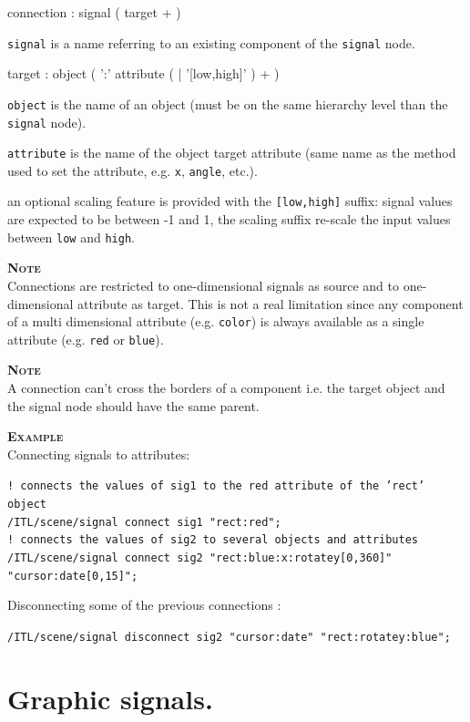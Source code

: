 \documentclass[a4paper,twoside]{report}
\newcommand{\sublevel}[1]	{\section{#1}}
\newcommand{\OSC}[1]		{\texttt{#1}}
\newcommand{\example}		{\textbf{\hspace{-1.5cm}\textbf{\textsc{Example }}}}
\newcommand{\note}	[1]		{\vspace{2mm}\textbf{\hspace{-0.9cm}\textbf{\textsc{Note #1}}}}
\let\olditemize\itemize
\let\oldenditemize\enditemize
\renewenvironment{itemize} 	{\olditemize \setlength{\itemsep}{1mm}}{\oldenditemize}
\newcommand{\sample}	[1]			{\vspace{-2mm}\begin{center}\colorbox{mygrey}{
								\begin{minipage}[t]{0.9\columnwidth} 
								{\small \texttt{#1}}
								\end{minipage}}\end{center}}
\begin{document}
\begin{rail}
connection : signal ( target + )
\end{rail}
\begin{itemize}
\item \OSC{signal} is a name referring to an existing component of the \OSC{signal} node. 
\end{itemize}

\begin{rail}
target :  object ( ':' attribute ( | '[low,high]' ) + )
\end{rail}
\begin{itemize}
\item \OSC{object} is the name of an object (must be on the same hierarchy level than the \OSC{signal} node).
\item \OSC{attribute} is the name of the object target attribute (same name as the method used to set the attribute, e.g. \OSC{x}, \OSC{angle}, etc.).
\item an optional scaling feature is provided with the \OSC{[low,high]} suffix: signal values are expected to be between -1 and 1, the scaling suffix re-scale the input values between \OSC{low} and \OSC{high}.
\end{itemize}

\note{} \\
Connections are restricted to one-dimensional signals as source and to one-dimensional attribute as target. This is not a real limitation since any component of a multi dimensional attribute (e.g. \OSC{color}) is always available as a single attribute (e.g. \OSC{red} or \OSC{blue}).

\note{} \\
A connection can't cross the borders of a component i.e. the target object and the signal node should have the same parent.

\example \\
Connecting signals to attributes:
\sample{! connects the values of sig1 to the red attribute of the 'rect' object \\
/ITL/scene/signal connect sig1 "rect:red"; \\
! connects the values of sig2 to several objects and attributes \\
/ITL/scene/signal connect sig2 "rect:blue:x:rotatey[0,360]" "cursor:date[0,15]";}
Disconnecting some of the previous connections :
\sample{/ITL/scene/signal disconnect sig2 "cursor:date" "rect:rotatey:blue"; }

\sublevel{Graphic signals.}
\label{gsignal}
\end{document}
